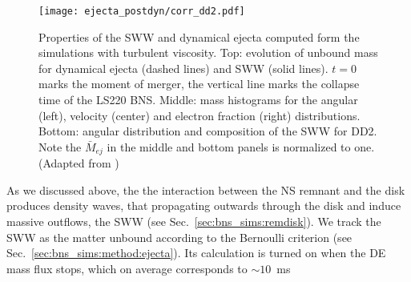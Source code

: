 \begin{figure}[t]
    \centering
    \texttt{[image: ejecta\_postdyn/corr\_dd2.pdf]}
    \caption{Properties of the \ac{SWW} and dynamical ejecta
        computed form the simulations with turbulent viscosity.
        Top: evolution of unbound mass for dynamical ejecta
        (dashed lines)
        and \ac{SWW}
        (solid lines). $t=0$ marks the moment of merger, the vertical
        line marks the collapse time of the LS220 BNS.
        Middle: mass histograms for the angular (left), velocity (center) and electron
        fraction (right) distributions.
        Bottom: angular distribution and composition of the \ac{SWW}
        for DD2.
        Note the $\bar{M}_{ej}$ in the middle and bottom panels is normalized to one.
        (Adapted from \citet{Nedora:2019jhl})
    }
    \label{fig:ej_properties}
    
\end{figure}



As we discussed above, the the interaction between the \ac{NS} remnant and the disk 
produces density waves, that propagating outwards through the disk and induce massive outflows, 
the \ac{SWW} (see Sec.~\ref{sec:bns_sims:remdisk}).
%
We track the \ac{SWW} as the matter unbound according to the Bernoulli criterion 
(see Sec.~\ref{sec:bns_sims:method:ejecta}). Its calculation is turned on when
the \ac{DE} mass flux stops, which on average corresponds to ${\sim10}$~ms \pmerg{} 
%


